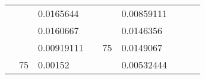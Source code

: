 \begin{table}[H]
\begin{tabular}{|cclcclccc}
\multicolumn{1}{|c|}{\cellcolor[HTML]{FFFFC7}}                                & \multicolumn{1}{c|}{\cellcolor[HTML]{DAE8FC}}                      & \multicolumn{1}{l|}{\cellcolor[HTML]{DAE8FC}0.0165644}   & \multicolumn{1}{c|}{\cellcolor[HTML]{FFFFC7}}                                & \multicolumn{1}{c|}{\cellcolor[HTML]{DAE8FC}}                       & \multicolumn{1}{l|}{\cellcolor[HTML]{DDFDFF}0.00859111}  &                                                                              &                                                                    &                                                          \\ \cline{3-3} \cline{6-6}
\multicolumn{1}{|c|}{\cellcolor[HTML]{FFFFC7}}                                & \multicolumn{1}{c|}{\cellcolor[HTML]{DAE8FC}}                      & \multicolumn{1}{l|}{\cellcolor[HTML]{DDFDFF}0.0160667}   & \multicolumn{1}{c|}{\cellcolor[HTML]{FFFFC7}}                                & \multicolumn{1}{c|}{\cellcolor[HTML]{DAE8FC}}                       & \multicolumn{1}{l|}{\cellcolor[HTML]{DAE8FC}0.0146356}   &                                                                              &                                                                    &                                                          \\ \cline{3-3} \cline{6-6}
\multicolumn{1}{|c|}{\cellcolor[HTML]{FFFFC7}}                                & \multicolumn{1}{c|}{\cellcolor[HTML]{DAE8FC}}                      & \multicolumn{1}{l|}{\cellcolor[HTML]{DAE8FC}0.00919111}  & \multicolumn{1}{c|}{\cellcolor[HTML]{FFFFC7}}                                & \multicolumn{1}{c|}{\multirow{-10}{*}{\cellcolor[HTML]{DAE8FC}75}}  & \multicolumn{1}{l|}{\cellcolor[HTML]{DDFDFF}0.0149067}   &                                                                              &                                                                    &                                                          \\ \cline{3-3} \cline{5-6}
\multicolumn{1}{|c|}{\cellcolor[HTML]{FFFFC7}}                                & \multicolumn{1}{c|}{\multirow{-10}{*}{\cellcolor[HTML]{DAE8FC}75}} & \multicolumn{1}{l|}{\cellcolor[HTML]{DDFDFF}0.00152}     & \multicolumn{1}{c|}{\cellcolor[HTML]{FFFFC7}}                                & \multicolumn{1}{c|}{\cellcolor[HTML]{DDFDFF}}                       & \multicolumn{1}{l|}{\cellcolor[HTML]{DAE8FC}0.00532444}  &                                                                              &                                                                    &                                                          \\ \cline{2-3} \cline{6-6}

\end{tabular}
\end{table}
